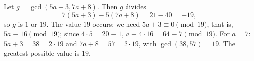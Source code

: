 Let $g=\gcd(5a+3,7a+8)$. Then $g$ divides
\[7(5a+3)-5(7a+8)=21-40=-19,\]
so $g$ is $1$ or $19$. The value $19$ occurs: we need $5a+3\equiv0\pmod{19}$, that is, $5a\equiv16\pmod{19}$; since $4\cdot5=20\equiv1$, $a\equiv4\cdot16=64\equiv7\pmod{19}$. For $a=7$: $5a+3=38=2\cdot19$ and $7a+8=57=3\cdot19$, with $\gcd(38,57)=19$. The greatest possible value is $\boxed{19}$.
